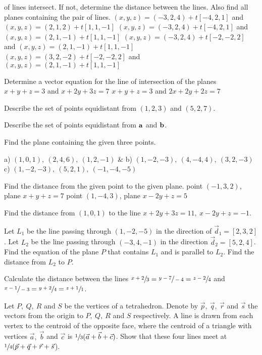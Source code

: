 {of lines intersect. If not, determine the distance between the lines.
Also find all planes containing the pair of lines.
 $(x,y,z) = (-3,2,4)+t[-4,2,1]$ and $(x,y,z) = (2,1,2)+t[1,1,-1]$
 $(x,y,z) = (-3,2,4)+t[-4,2,1]$ and $(x,y,z) = (2,1,-1)+t[1,1,-1]$
 $(x,y,z) = (-3,2,4)+t[-2,-2,2]$ and $(x,y,z) = (2,1,-1)+t[1,1,-1]$
 $(x,y,z) = (3,2,-2)+t[-2,-2,2]$ and $(x,y,z) = (2,1,-1)+t[1,1,-1]$
\medskip
\item{\next} Determine a vector equation for the line of intersection
of the planes
 $x+y+z=3$ and $x+2y+3z=7$
 $x+y+z=3$ and $2x+2y+2z=7$
\medskip
\item{\next} Describe the set of points equidistant from $(1,2,3)$ and
$(5,2,7)$.
\medskip
\item{\next} Describe the set of points equidistant from ${\bf a}$ and
${\bf b}$.
\medskip
\item{\next} Find the plane containing the given three points.
\smallskip\item{}\vbox {\hsize=6.5in
\columns
\+a) $(1,0,1),\ (2,4,6),\ (1,2,-1)$ &
b) $(1,-2,-3),\ (4,-4,4),\ (3,2,-3)$ \cr
\+c) $(1,-2,-3),\ (5,2,1),\ (-1,-4,-5)$\cr
}
\medskip
\item{\next} Find the distance from the given point to the given plane.
 point $(-1,3,2)$, plane $x+y+z=7$
 point $(1,-4,3)$, plane $x-2y+z=5$
\smallskip
\medskip
\item{\next} Find the distance from $(1,0,1)$ to the line
$x+2y+3z=11,\ x-2y+z=-1$. 
\medskip
\item{\next} Let $L_1$ be the line passing through $(1,-2,-5)$ in the direction of $\vec d_1=[2,3,2]$. Let $L_2$ be the line passing through
$(-3,4,-1)$ in the direction $\vec d_2=[5,2,4]$.
 Find the equation of the plane $P$ that contains $L_1$
and is parallel to $L_2$. 
 Find the distance from $L_2$ to $P$.
\medskip
\item{\next} Calculate the distance between the lines 
$\sfrac{x+2}{3}=\sfrac{y-7}{-4}=\sfrac{z-2}{4}$ and $\sfrac{x-1}{-3}=\sfrac{y+2}{4}=\sfrac{z+1}{1}$.
\medskip
\item{\next} Let $P,\ Q,\ R$ and $S$ be the vertices of a tetrahedron.
Denote by $\vec p,\ \vec q,\ \vec r$ and $\vec s$ the vectors from the origin
to $P,\ Q,\ R$ and $S$ respectively. A line is drawn from each vertex to
the centroid of the opposite face, where the centroid of a triangle with 
vertices $\vec a,\ \vec b$ and $\vec c$ is $\sfrac{1}{3}(\vec a+\vec b+\vec
c)$. Show that these four lines meet at
$\sfrac{1}{4}(\vec p+\vec q+\vec r+\vec s$).
\medskip


}

